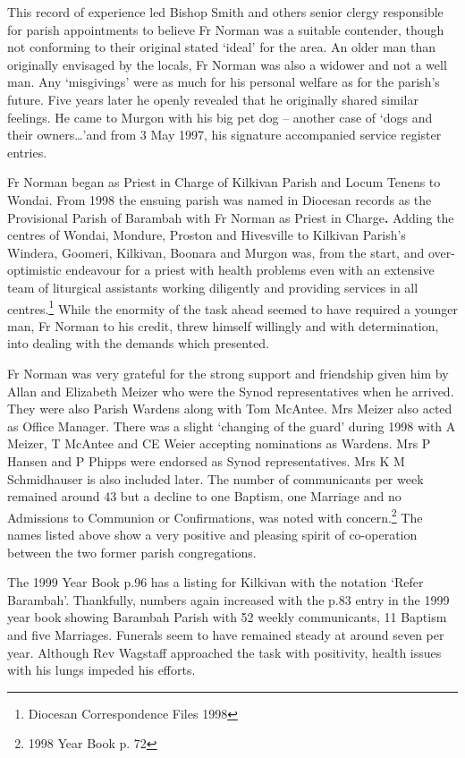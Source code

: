 This record of experience led Bishop Smith and others senior clergy responsible for parish appointments to believe Fr Norman was a suitable contender, though not conforming to their original stated `ideal' for the area. An older man than originally envisaged by the locals, Fr Norman was also a widower and not a well man. Any `misgivings' were as much for his personal welfare as for the parish's future. Five years later he openly revealed that he originally shared similar feelings. He came to Murgon with his big pet dog -- another case of `dogs and their owners\ldots'and from 3 May 1997, his signature accompanied service register entries.



Fr Norman began as Priest in Charge of Kilkivan Parish and Locum Tenens to Wondai. From 1998 the ensuing parish was named in Diocesan records as the Provisional Parish of Barambah with Fr Norman as Priest in Charge\textbf{.} Adding the centres of Wondai, Mondure, Proston and Hivesville to Kilkivan Parish's Windera, Goomeri, Kilkivan, Boonara and Murgon was, from the start, and over-optimistic endeavour for a priest with health problems even with an extensive team of liturgical assistants working diligently and providing services in all centres.\footnote{Diocesan Correspondence Files 1998} While the enormity of the task ahead seemed to have required a younger man, Fr Norman to his credit, threw himself willingly and with determination, into dealing with the demands which presented.


Fr Norman was very grateful for the strong support and friendship given him by Allan and Elizabeth Meizer who were the Synod representatives when he arrived. They were also Parish Wardens along with Tom McAntee. Mrs Meizer also acted as Office Manager. There was a slight `changing of the guard' during 1998 with A Meizer, T McAntee and CE Weier accepting nominations as Wardens. Mrs P Hansen and P Phipps were endorsed as Synod representatives. Mrs K M Schmidhauser is also included later. The number of communicants per week remained around 43 but a decline to one Baptism, one Marriage and no Admissions to Communion or Confirmations, was noted with concern.\footnote{1998 Year Book p. 72} The names listed above show a very positive and pleasing spirit of co-operation between the two former parish congregations.


The 1999 Year Book p.96 has a listing for Kilkivan with the notation `Refer Barambah'. Thankfully, numbers again increased with the p.83 entry in the 1999 year book showing Barambah Parish with 52 weekly communicants, 11 Baptism and five Marriages. Funerals seem to have remained steady at around seven per year. Although Rev Wagstaff approached the task with positivity, health issues with his lungs impeded his efforts.



